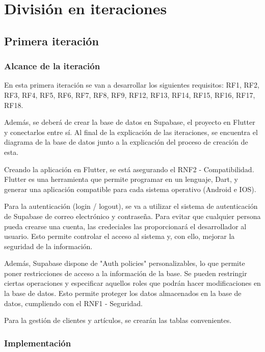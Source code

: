 \chapter{División en iteraciones}
\label{chap:iteraciones}

\section{Primera iteración}

\subsection{Alcance de la iteración}

En esta primera iteración se van a desarrollar los siguientes requisitos: RF1, RF2, RF3, RF4, RF5, RF6, RF7, RF8, RF9, RF12, RF13, RF14, RF15, RF16, RF17, RF18. 

Además, se deberá de crear la base de datos en Supabase, el proyecto en Flutter y conectarlos entre sí. Al final de la explicación de las iteraciones, se encuentra el diagrama de la base de datos junto a la explicación del proceso de creación de esta. 

Creando la aplicación en Flutter, se está asegurando el RNF2 - Compatibilidad. Flutter es una herramienta que permite programar en un lenguaje, Dart, y generar una aplicación compatible para cada sistema operativo (Android e IOS). 

Para la autenticación  (login / logout), se va a utilizar el sistema de autenticación de Supabase de correo electrónico y contraseña. Para evitar que cualquier persona pueda crearse una cuenta, las credeciales las proporcionará el desarrollador al usuario. Esto permite controlar el acceso al sistema y, con ello, mejorar la seguridad de la información. 

Además, Supabase dispone de "Auth policies" personalizables, lo que permite poner restricciones de acceso a la información de la base. Se pueden restringir ciertas operaciones y especificar aquellos roles que podrán hacer modificaciones en la base de datos. Esto permite proteger los datos almacenados en la base de datos, cumpliendo con el RNF1 - Seguridad. 

Para la gestión de clientes y artículos, se crearán las tablas convenientes. 

\subsection{Implementación}

